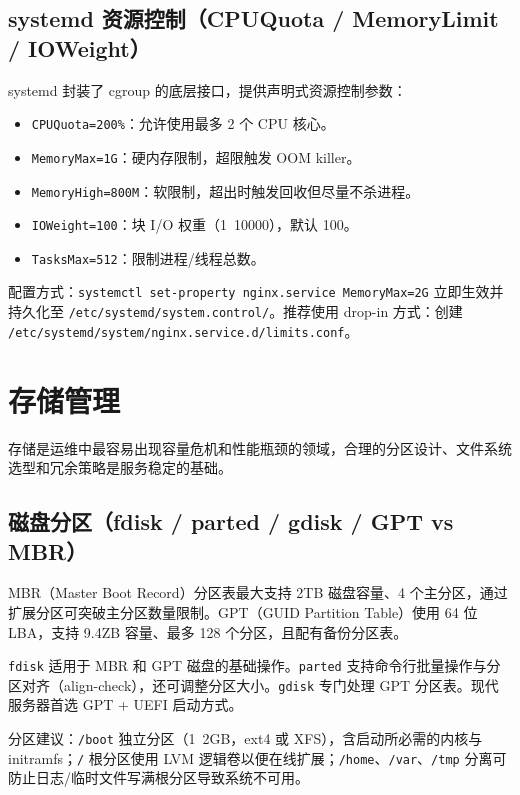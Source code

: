 \documentclass[12pt,UTF8]{ctexbook}
\begin{document}
    \subsection{systemd 资源控制（CPUQuota / MemoryLimit / IOWeight）}

systemd 封装了 cgroup 的底层接口，提供声明式资源控制参数：
\begin{itemize}
	\item \verb|CPUQuota=200%|：允许使用最多 2 个 CPU 核心。
	\item \verb|MemoryMax=1G|：硬内存限制，超限触发 OOM killer。
	\item \verb|MemoryHigh=800M|：软限制，超出时触发回收但尽量不杀进程。
	\item \verb|IOWeight=100|：块 I/O 权重（1~10000），默认 100。
	\item \verb|TasksMax=512|：限制进程/线程总数。
\end{itemize}

配置方式：\verb|systemctl set-property nginx.service MemoryMax=2G| 立即生效并持久化至 \verb|/etc/systemd/system.control/|。推荐使用 drop-in 方式：创建 \verb|/etc/systemd/system/nginx.service.d/limits.conf|。

  \section{存储管理}

存储是运维中最容易出现容量危机和性能瓶颈的领域，合理的分区设计、文件系统选型和冗余策略是服务稳定的基础。

    \subsection{磁盘分区（fdisk / parted / gdisk / GPT vs MBR）}

MBR（Master Boot Record）分区表最大支持 2TB 磁盘容量、4 个主分区，通过扩展分区可突破主分区数量限制。GPT（GUID Partition Table）使用 64 位 LBA，支持 9.4ZB 容量、最多 128 个分区，且配有备份分区表。

\verb|fdisk| 适用于 MBR 和 GPT 磁盘的基础操作。\verb|parted| 支持命令行批量操作与分区对齐（align-check），还可调整分区大小。\verb|gdisk| 专门处理 GPT 分区表。现代服务器首选 GPT + UEFI 启动方式。

分区建议：\verb|/boot| 独立分区（1~2GB，ext4 或 XFS），含启动所必需的内核与 initramfs；\verb|/| 根分区使用 LVM 逻辑卷以便在线扩展；\verb|/home|、\verb|/var|、\verb|/tmp| 分离可防止日志/临时文件写满根分区导致系统不可用。
\end{document}
